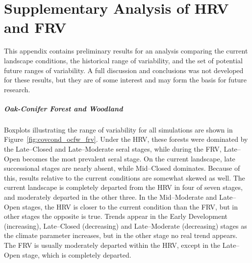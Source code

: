 
\chapter{Supplementary Analysis of HRV and FRV}
\label{app:futurecovcond}

This appendix contains preliminary results for an analysis comparing the current landscape conditions, the historical range of variability, and the set of potential future ranges of variability. A full discussion and conclusions was not developed for these results, but they are of some interest and may form the basis for future research.

\paragraph*{Oak-Conifer Forest and Woodland} 
Boxplots illustrating the range of variability for all simulations are shown in Figure~\ref{fig:covcond_ocfw_frv}. Under the HRV, these forests were dominated by the Late--Closed and Late--Moderate seral stages, while during the FRV, Late--Open becomes the most prevalent seral stage. On the current landscape, late successional stages are nearly absent, while Mid--Closed dominates. Because of this, results relative to the current conditions are somewhat skewed as well. The current landscape is completely departed from the HRV in four of seven stages, and moderately departed in the other three. In the Mid--Moderate and Late--Open stages, the HRV is closer to the current condition than the FRV, but in other stages the opposite is true. Trends appear in the Early Development (increasing), Late--Closed (decreasing) and Late--Moderate (decreasing) stages as the climate parameter increases, but in the other stage no real trend appears. The FRV is usually moderately departed within the HRV, except in the Late--Open stage, which is completely departed.


